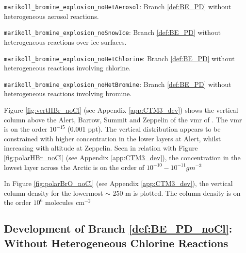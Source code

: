 \begin{mydef}\label{def:BE_PD_noAerosol}
    \texttt{marikoll\_bromine\_explosion\_noHetAerosol}: Branch \ref{def:BE_PD} without heterogeneous aerosol reactions. 
\end{mydef}

\begin{mydef}\label{def:BE_PD_noIce}
    \texttt{marikoll\_bromine\_explosion\_noSnowIce}: Branch \ref{def:BE_PD} without heterogeneous reactions over ice surfaces.
\end{mydef}

\begin{mydef}\label{def:BE_PD_noCl}
    \texttt{marikoll\_bromine\_explosion\_noHetChlorine}: Branch \ref{def:BE_PD} without heterogeneous reactions involving chlorine.
\end{mydef}

\begin{mydef}\label{def:BE_PD_noBr}
    \texttt{marikoll\_bromine\_explosion\_noHetBromine}: Branch \ref{def:BE_PD} without heterogeneous reactions involving bromine.
\end{mydef}









\medskip

Figure \ref{fig:vertHBr_noCl} (see Appendix \ref{app:CTM3_dev}) shows the vertical column above the Alert, Barrow, Summit and Zeppelin of the \acrshort{vmr} of . The \acrshort{vmr} is on the order $10^{-15}$ (0.001 ppt). The vertical distribution appears to be constrained with higher concentration in the lower layers at Alert, whilst increasing with altitude at Zeppelin. Seen in relation with Figure \ref{fig:polarHBr_noCl} (see Appendix \ref{app:CTM3_dev}), the concentration in the lowest layer across the Arctic is on the order of $10^{-10} - 10^{-11} g m^{-3}$

\medskip

In Figure \ref{fig:polarBrO_noCl} (see Appendix \ref{app:CTM3_dev}), the vertical column density for the lowermost $\sim$ 250 m is plotted. The column density is on the order $10^{6}$ molecules cm$^{-2}$


\subsection{Development of Branch \ref{def:BE_PD_noCl}: Without Heterogeneous Chlorine Reactions}\label{sec:res_noHetCl}

